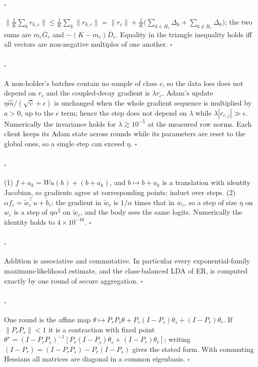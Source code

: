\documentclass[10pt]{article}
\theoremstyle{plain}
\theoremstyle{definition}
\newcommand{\ER}{\textsc{ER}}
\begin{document}
\paragraph{.} $\|\frac1K\sum_kr_{k,c}\|\le\frac1K\sum_k\|r_{k,c}\|=\|r_c\|+\frac1K\big(\sum_{k\in
H_c}\Delta_k+\sum_{k\notin H_c}\Delta_k\big)$; the two sums are $m_c\bar G_c$ and $-(K-m_c)\bar D_c$. Equality in the
triangle inequality holds iff all vectors are non-negative multiples of one another. \hfill$\square$

\paragraph{.} A non-holder's batches contain no sample of class $c$, so the data loss does not depend on
$r_c$ and the coupled-decay gradient is $\lambda r_c$. Adam's update $\eta\hat m/(\sqrt{\hat v}+\epsilon)$ is unchanged
when the whole gradient sequence is multiplied by $a>0$, up to the $\epsilon$ term; hence the step does not depend on
$\lambda$ while $\lambda|r_{c,j}|\gg\epsilon$. Numerically the invariance holds for $\lambda\gtrsim10^{-5}$ at the
measured row norms. Each client keeps its Adam state across rounds while its parameters are reset to the global ones,
so a single step can exceed $\eta$. \hfill$\square$

\paragraph{.} (1) $f+a_k=Wu(h)+(b+a_k)$, and $b\mapsto b+a_k$ is a translation with identity
Jacobian, so gradients agree at corresponding points; induct over steps. (2) $\alpha f_c=\tilde w_c^\top u+\tilde b_c$;
the gradient in $\tilde w_c$ is $1/\alpha$ times that in $w_c$, so a step of size $\eta$ on $w_c$ is a step of
$\eta\alpha^2$ on $\tilde w_c$, and the body sees the same logits. Numerically the identity holds to $4\times10^{-16}$.
\hfill$\square$

\paragraph{.} Addition is associative and commutative. In particular every exponential-family
maximum-likelihood estimate, and the class-balanced LDA of \ER, is computed exactly by one round of secure aggregation.
\hfill$\square$

\paragraph{.} One round is the affine map $\theta\mapsto P_rP_s\theta+P_r(I-P_s)\theta_s+(I-P_r)\theta_r$.
If $\|P_rP_s\|<1$ it is a contraction with fixed point $\theta^\star=(I-P_rP_s)^{-1}[P_r(I-P_s)\theta_s+(I-P_r)\theta_r]$;
writing $(I-P_r)=(I-P_rP_s)-P_r(I-P_s)$ gives the stated form. With commuting Hessians all matrices are diagonal in a
common eigenbasis. \hfill$\square$
\end{document}
